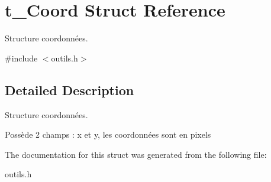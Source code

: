 \hypertarget{structt__Coord}{}\section{t\+\_\+\+Coord Struct Reference}
\label{structt__Coord}


Structure coordonnées.  




{\ttfamily \#include $<$outils.\+h$>$}



\subsection{Detailed Description}
Structure coordonnées. 

Possède 2 champs \+: x et y, les coordonnées sont en pixels 

The documentation for this struct was generated from the following file\+:\begin{DoxyCompactItemize}
\item 
outils.\+h\end{DoxyCompactItemize}
